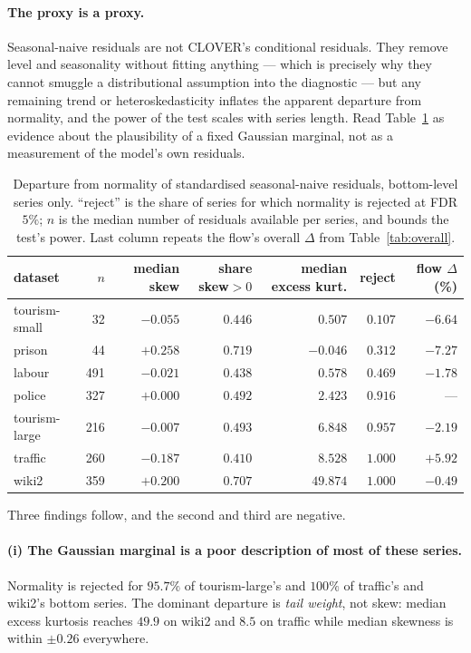 \documentclass[11pt]{article}
\begin{document}
\paragraph{The proxy is a proxy.} Seasonal-naive residuals are not CLOVER's
conditional residuals. They remove level and seasonality without fitting anything ---
which is precisely why they cannot smuggle a distributional assumption into the
diagnostic --- but any remaining trend or heteroskedasticity inflates the apparent
departure from normality, and the power of the test scales with series length. Read
Table~\ref{tab:nongauss} as evidence about the plausibility of a fixed Gaussian
marginal, not as a measurement of the model's own residuals.

\begin{table}[t]
\centering
\caption{Departure from normality of standardised seasonal-naive residuals,
bottom-level series only. ``reject'' is the share of series for which normality is
rejected at FDR $5\%$; $n$ is the median number of residuals available per series,
and bounds the test's power. Last column repeats the flow's overall $\Delta$ from
Table~\ref{tab:overall}.}
\label{tab:nongauss}
\small
\begin{tabular}{lrrrrrr}
\toprule
dataset & $n$ & median skew & share skew${>}0$ & median excess kurt. & reject & flow $\Delta$ (\%) \\
\midrule
tourism-small & 32  & $-0.055$ & $0.446$ & $0.507$  & $0.107$ & $-6.64$ \\
prison        & 44  & $+0.258$ & $0.719$ & $-0.046$ & $0.312$ & $-7.27$ \\
labour        & 491 & $-0.021$ & $0.438$ & $0.578$  & $0.469$ & $-1.78$ \\
police        & 327 & $+0.000$ & $0.492$ & $2.423$  & $0.916$ & --- \\
tourism-large & 216 & $-0.007$ & $0.493$ & $6.848$  & $0.957$ & $-2.19$ \\
traffic       & 260 & $-0.187$ & $0.410$ & $8.528$  & $1.000$ & $+5.92$ \\
wiki2         & 359 & $+0.200$ & $0.707$ & $49.874$ & $1.000$ & $-0.49$ \\
\bottomrule
\end{tabular}
\end{table}

Three findings follow, and the second and third are negative.

\paragraph{(i) The Gaussian marginal is a poor description of most of these series.}
Normality is rejected for $95.7\%$ of tourism-large's and $100\%$ of traffic's and
wiki2's bottom series. The dominant departure is \emph{tail weight}, not skew: median
excess kurtosis reaches $49.9$ on wiki2 and $8.5$ on traffic while median skewness
is within $\pm 0.26$ everywhere.
\end{document}
